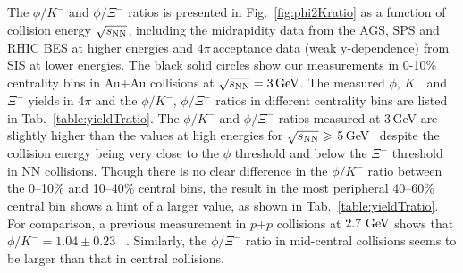 \documentclass[%
 reprint,	
showpacs,
 amsmath,amssymb,
 aps,
 superscriptaddress,
]{revtex4-1}
\begin{document}
The $\phi/K^-$ and $\phi/\Xi^-$ ratios is presented in Fig.~\ref{fig:phi2Kratio} as a function of collision energy $\sqrt{s_{\rm NN}}$, including the midrapidity data from the AGS, SPS and RHIC BES at higher energies and $4\pi$\,acceptance data (weak y-dependence) from SIS at lower energies. The black solid circles show our measurements in 0-10\% centrality bins in Au+Au collisions at ${\sqrt{s_{\rm NN}} = \rm{3\,GeV}}$. The measured $\phi$, $K^-$ and $\Xi^-$ yields in 4$\pi$ and the $\phi/K^-$, $\phi/\Xi^-$ ratios in different centrality bins are listed in Tab.~\ref{table:yieldTratio}. The $\phi/K^-$ and $\phi/\Xi^-$ ratios measured at 3\,GeV are %
slightly higher than the values at high energies for $\sqrt{s_{\rm NN}}\geqslant$ 5\,GeV~\cite{NA49_phi,NA49_piK,NA49_piK2,E917_phi,ALICE_phi_2p7TeV,STAR_phi_64a200GeV,Xi_ArKCl_HADES,star_bes_strangeness} despite the collision energy being very close to the $\phi$ threshold and below the $\Xi^-$ threshold in NN collisions. %
Though there is no clear difference in the $\phi/K^-$ ratio between the \textup{0--10\%} and \textup{10--40\%} central bins, the result in the most peripheral 40--60\% central bin shows a hint of a larger value, as shown in Tab.~\ref{table:yieldTratio}. For comparison, a previous measurement in $p$+$p$ collisions at $\textup{2.7 GeV}$ shows that $\phi/K^- = 1.04\pm0.23$ ~\cite{ANKE_phi}. Similarly, the $\phi/\Xi^-$ ratio in mid-central collisions seems to be larger than that in central collisions.
\end{document}
